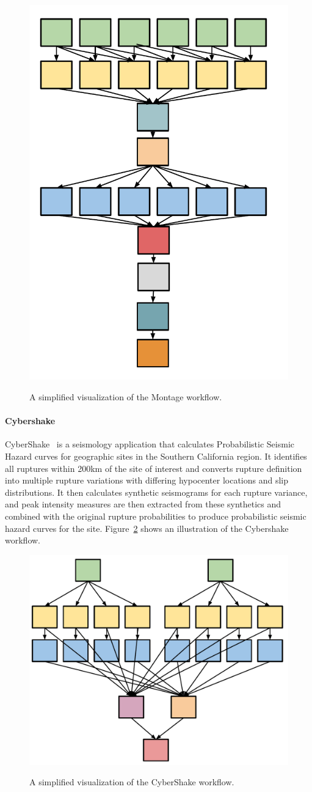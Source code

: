 \begin{figure}[htb]
	\centering
	\includegraphics[width=0.55\linewidth]{figure15.pdf} \\
	\caption{A simplified visualization of the Montage workflow.}
	\label{fig:evaluation_shape_montage}
\end{figure}

\paragraph{\textbf{Cybershake}}
CyberShake~\cite{Graves2010} is a seismology application that calculates Probabilistic Seismic Hazard curves for geographic sites in the Southern California region. It identifies all ruptures within 200km of the site of interest and converts rupture definition into multiple rupture variations with differing hypocenter locations and slip distributions. It then calculates synthetic seismograms for each rupture variance, and peak intensity measures are then extracted from these synthetics and combined with the original rupture probabilities to produce probabilistic seismic hazard curves for the site. Figure~\ref{fig:evaluation_shape_cybershake} shows an illustration of the Cybershake workflow.

\begin{figure}[htb]
	\centering
	\includegraphics[width=0.7\linewidth]{figure16.pdf} \\
	\caption{A simplified visualization of the CyberShake workflow.}
	\label{fig:evaluation_shape_cybershake}
\end{figure}

